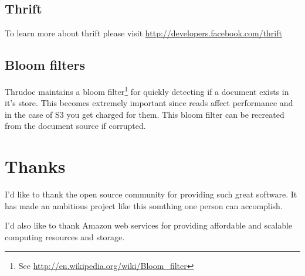\documentclass[nocopyrightspace,blockstyle]{sigplanconf}
\begin{document}
\subsection{Thrift}

To learn more about thrift please visit \url{http://developers.facebook.com/thrift}

\subsection{Bloom filters}

Thrudoc maintains a bloom filter\footnote{See \url{http://en.wikipedia.org/wiki/Bloom_filter}} 
for quickly detecting if a document exists in it's store.  
This becomes extremely important since reads affect performance and in the case of S3 you get charged for them.
This bloom filter can be recreated from the document source if corrupted.

\section{Thanks}

I'd like to thank the open source community for providing such great software.  
It has made an ambitious project like this somthing one person can accomplish.

I'd also like to thank Amazon web services for providing affordable and scalable
computing resources and storage.
\end{document}
